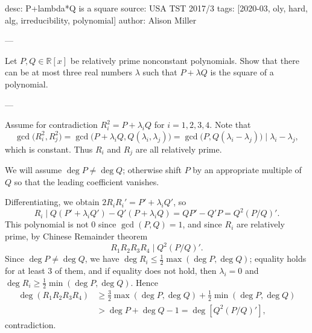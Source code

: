 desc: P+lambda*Q is a square
source: USA TST 2017/3
tags: [2020-03, oly, hard, alg, irreducibility, polynomial]
author: Alison Miller

---

Let $P,Q\in\mathbb R[x]$ be relatively prime nonconstant polynomials. Show that there can be at most three real numbers $\lambda$ such that $P+\lambda Q$ is the square of a polynomial.

---

Assume for contradiction $R_i^2=P+\lambda_iQ$ for $i=1,2,3,4$. Note that \[\gcd\big(R_i^2,R_j^2\big)=\gcd\big(P+\lambda_iQ,Q(\lambda_i,\lambda_j)\big)=\gcd\big(P,Q(\lambda_i-\lambda_j)\big)\mid \lambda_i-\lambda_j,\]
which is constant. Thus $R_i$ and $R_j$ are all relatively prime.

We will assume $\deg P\ne\deg Q$; otherwise shift $P$ by an appropriate multiple of $Q$ so that the leading coefficient vanishes.

Differentiating, we obtain $2R_iR_i'=P'+\lambda_iQ'$, so \[R_i\mid Q(P'+\lambda_iQ')-Q'(P+\lambda_iQ)=QP'-Q'P=Q^2(P/Q)'.\]
This polynomial is not $0$ since $\gcd(P,Q)=1$, and since $R_i$ are relatively prime, by Chinese Remainder theorem \[R_1R_2R_3R_4\mid Q^2(P/Q)'.\]
Since $\deg P\ne \deg Q$, we have $\deg R_i\le\tfrac12\max(\deg P,\deg Q)$; equality holds for at least $3$ of them, and if equality does not hold, then $\lambda_i=0$ and $\deg R_i\ge\tfrac12\min(\deg P,\deg Q)$. Hence
\begin{align*}
\deg(R_1R_2R_3R_4)&\ge\tfrac32\max(\deg P,\deg Q)+\tfrac12\min(\deg P,\deg Q)\\
&>\deg P+\deg Q-1=\deg\left[Q^2(P/Q)'\right],
\end{align*}
contradiction.
